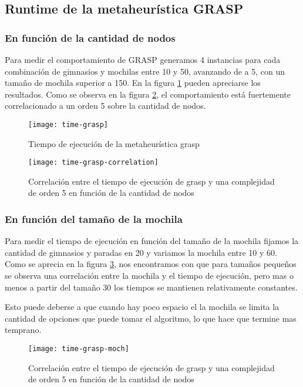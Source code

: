 \subsection{Runtime de la metaheurística GRASP}

\subsubsection{En función de la cantidad de nodos}

Para medir el comportamiento de GRASP generamos 4 instancias para cada combinación de gimnasios y mochilas entre 10 y 50, avanzando de a 5, con un tamaño de mochila superior a 150. En la figura \ref{fig:time-grasp} pueden apreciarse los resultados. Como se observa en la figura \ref{fig:time-grasp-correlation}, el comportamiento está fuertemente correlacionado a un orden 5 sobre la cantidad de nodos.

\begin{figure}[H]
    \centering
    \texttt{[image: time-grasp]}
    \caption{Tiempo de ejecución de la metaheurística grasp}
    \label{fig:time-grasp}
\end{figure}

\begin{figure}[H]
    \centering
    \texttt{[image: time-grasp-correlation]}
    \caption{Correlación entre el tiempo de ejecución de grasp y una complejidad de orden 5 en función de la cantidad de nodos}
    \label{fig:time-grasp-correlation}
\end{figure}

\subsubsection{En función del tamaño de la mochila}

Para medir el tiempo de ejecución en función del tamaño de la mochila fijamos la cantidad de gimnasios y paradas en 20 y variamos la mochila entre 10 y 60. Como se aprecia en la figura \ref{fig:time-grasp-moch}, nos encontramos con que para tamaños pequeños se observa una correlación entre la mochila y el tiempo de ejecución, pero mas o menos a partir del tamaño 30 los tiempos se mantienen relativamente constantes.

Esto puede deberse a que cuando hay poco espacio el la mochila se limita la cantidad de opciones que puede tomar el algoritmo, lo que hace que termine mas temprano.

\begin{figure}[H]
    \centering
    \texttt{[image: time-grasp-moch]}
    \caption{Correlación entre el tiempo de ejecución de grasp y una complejidad de orden 5 en función de la cantidad de nodos}
    \label{fig:time-grasp-moch}
\end{figure}

